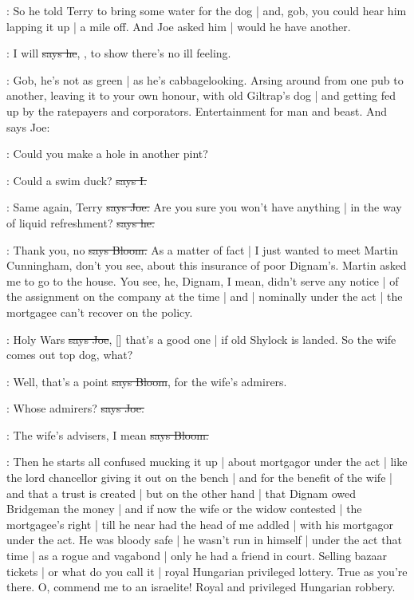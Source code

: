 \Nq:
So he told Terry to bring some water for the dog |
and,
gob,
you could hear him lapping it up |
a mile off.
And Joe asked him |
would he have another.%

\citizen:
I will
\sout{says he},
,
to show there's no ill feeling.

\Nq:
Gob,
he's not as green |
as he's cabbagelooking.
Arsing around from one pub to another,
leaving it to your own honour,
with old Giltrap's dog |
and getting fed up by the ratepayers and corporators.
Entertainment for man and beast.
And says Joe:

\joe:
Could you make a hole in another pint?

:
Could a swim duck?
\sout{says I.}

\joe:
Same again,
Terry
\sout{says Joe.}
Are you sure you won't have anything |
in the way of liquid refreshment?
\sout{says he.}

\Bloom:
Thank you,
no
\sout{says Bloom.}
As a matter of fact |
I just wanted to meet Martin Cunningham,
don't you see,
about this insurance of poor Dignam's.
Martin asked me to go to the house.
You see,
he,
Dignam,
I mean,
didn't serve any notice |
of the assignment on the company at the time |
and |
nominally under the act |
the mortgagee can't recover on the policy.

\joe:
Holy Wars
\sout{says Joe},
[]
that's a good one |
if old Shylock is landed.
So the wife comes out top dog,
what?

\Bloom:
Well,
that's a point
\sout{says Bloom},
for the wife's admirers.

\joe:
Whose admirers?
\sout{says Joe.}

\Bloom:
The wife's advisers,
I mean
\sout{says Bloom.}

\Nq:
Then he starts all confused
mucking it up |
about mortgagor under the act |
like the lord chancellor giving it out on the bench |
and for the benefit of the wife |
and that a trust is created |
but on the other hand |
that Dignam owed Bridgeman the money |
and if now the wife or the widow contested |
the mortgagee's right |
till he near had the head of me addled |
with his mortgagor under the act.
He was bloody safe |
he wasn't run in himself |
under the act that time |
as a rogue and vagabond |
only he had a friend in court.
Selling bazaar tickets |
or what do you call it |
royal Hungarian privileged lottery.
True as you're there.
O,
commend me to an israelite!
Royal and privileged Hungarian robbery.

